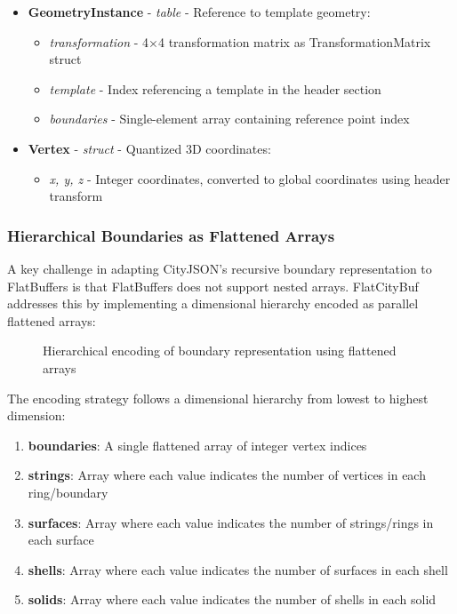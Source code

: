 \begin{itemize}
  \item \textbf{GeometryInstance} - \textit{table} - Reference to template geometry:
    \begin{itemize}
      \item \textit{transformation} - 4×4 transformation matrix as TransformationMatrix struct
      \item \textit{template} - Index referencing a template in the header section
      \item \textit{boundaries} - Single-element array containing reference point index
    \end{itemize}

  \item \textbf{Vertex} - \textit{struct} - Quantized 3D coordinates:
    \begin{itemize}
      \item \textit{x, y, z} - Integer coordinates, converted to global coordinates using header transform
    \end{itemize}
\end{itemize}

\subsubsection{Hierarchical Boundaries as Flattened Arrays}
\label{methodology:feature_encoding:geometry_encoding:flattened_arrays}

A key challenge in adapting CityJSON's recursive boundary representation to FlatBuffers is that FlatBuffers does not support nested arrays. FlatCityBuf addresses this by implementing a dimensional hierarchy encoded as parallel flattened arrays:

\begin{figure}[h]
  \centering
  \caption{Hierarchical encoding of boundary representation using flattened arrays}
  \label{fig:methodology:boundary_encoding}
\end{figure}

The encoding strategy follows a dimensional hierarchy from lowest to highest dimension:

\begin{enumerate}
  \item \textbf{boundaries}: A single flattened array of integer vertex indices
  \item \textbf{strings}: Array where each value indicates the number of vertices in each ring/boundary
  \item \textbf{surfaces}: Array where each value indicates the number of strings/rings in each surface
  \item \textbf{shells}: Array where each value indicates the number of surfaces in each shell
  \item \textbf{solids}: Array where each value indicates the number of shells in each solid
\end{enumerate}

